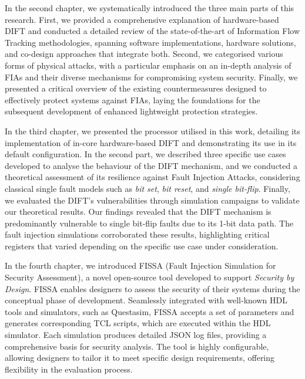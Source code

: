 In the second chapter, we systematically introduced the three main parts of this research. First, we provided a comprehensive explanation of hardware-based DIFT and conducted a detailed review of the state-of-the-art of Information Flow Tracking methodologies, spanning software implementations, hardware solutions, and co-design approaches that integrate both. Second, we categorised various forms of physical attacks, with a particular emphasis on an in-depth analysis of FIAs and their diverse mechanisms for compromising system security. Finally, we presented a critical overview of the existing countermeasures designed to effectively protect systems against FIAs, laying the foundations for the subsequent development of enhanced lightweight protection strategies.

In the third chapter, we presented the processor utilised in this work, detailing its implementation of in-core hardware-based DIFT and demonstrating its use in its default configuration. In the second part, we described three specific use cases developed to analyse the behaviour of the DIFT mechanism, and we conducted a theoretical assessment of its resilience against Fault Injection Attacks, considering classical single fault models such as \textit{bit set}, \textit{bit reset}, and \textit{single bit-flip}. Finally, we evaluated the DIFT's vulnerabilities through simulation campaigns to validate our theoretical results. Our findings revealed that the DIFT mechanism is predominantly vulnerable to single bit-flip faults due to its 1-bit data path. The fault injection simulations corroborated these results, highlighting critical registers that varied depending on the specific use case under consideration.

In the fourth chapter, we introduced FISSA (Fault Injection Simulation for Security Assessment), a novel open-source tool developed to support \textit{Security by Design}. FISSA enables designers to assess the security of their systems during the conceptual phase of development. Seamlessly integrated with well-known HDL tools and simulators, such as Questasim, FISSA accepts a set of parameters and generates corresponding TCL scripts, which are executed within the HDL simulator. Each simulation produces detailed JSON log files, providing a comprehensive basis for security analysis. The tool is highly configurable, allowing designers to tailor it to meet specific design requirements, offering flexibility in the evaluation process.


